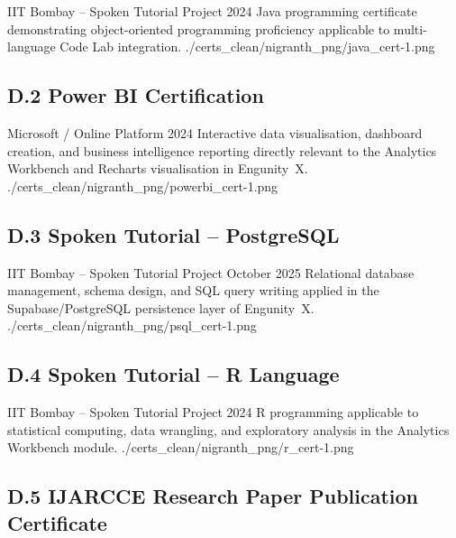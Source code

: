 \certentry
  {IIT Bombay -- Spoken Tutorial Project}
  {2024}
  {Java programming certificate demonstrating object-oriented programming
   proficiency applicable to multi-language Code Lab integration.}
  {./certs_clean/nigranth_png/java_cert-1.png}

\subsection*{D.2 \quad Power BI Certification}

\certentry
  {Microsoft / Online Platform}
  {2024}
  {Interactive data visualisation, dashboard creation, and business intelligence
   reporting directly relevant to the Analytics Workbench and Recharts
   visualisation in Engunity~X.}
  {./certs_clean/nigranth_png/powerbi_cert-1.png}

\subsection*{D.3 \quad Spoken Tutorial -- PostgreSQL}

\certentry
  {IIT Bombay -- Spoken Tutorial Project}
  {October 2025}
  {Relational database management, schema design, and SQL query writing applied
   in the Supabase/PostgreSQL persistence layer of Engunity~X.}
  {./certs_clean/nigranth_png/psql_cert-1.png}

\subsection*{D.4 \quad Spoken Tutorial -- R Language}

\certentry
  {IIT Bombay -- Spoken Tutorial Project}
  {2024}
  {R programming applicable to statistical computing, data wrangling, and
   exploratory analysis in the Analytics Workbench module.}
  {./certs_clean/nigranth_png/r_cert-1.png}

\subsection*{D.5 \quad IJARCCE Research Paper Publication Certificate}

